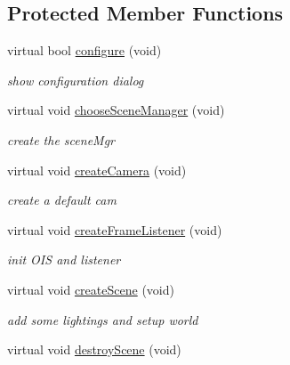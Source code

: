 \subsection*{Protected Member Functions}
\begin{DoxyCompactItemize}
\item 
virtual bool \hyperlink{class_whitedrop_1_1_whitedrop_engine_a9aaaf4639715462ebdd5bd8165da0f6a}{configure} (void)
\begin{DoxyCompactList}\small\item\em show configuration dialog \end{DoxyCompactList}\item 
\hypertarget{class_whitedrop_1_1_whitedrop_engine_adfdbe918f7e7614c539cd8954762a333}{virtual void \hyperlink{class_whitedrop_1_1_whitedrop_engine_adfdbe918f7e7614c539cd8954762a333}{choose\+Scene\+Manager} (void)}\label{class_whitedrop_1_1_whitedrop_engine_adfdbe918f7e7614c539cd8954762a333}

\begin{DoxyCompactList}\small\item\em create the scene\+Mgr \end{DoxyCompactList}\item 
virtual void \hyperlink{class_whitedrop_1_1_whitedrop_engine_a7e0779f436c679f507672b55d22b86f2}{create\+Camera} (void)
\begin{DoxyCompactList}\small\item\em create a default cam \end{DoxyCompactList}\item 
\hypertarget{class_whitedrop_1_1_whitedrop_engine_ada66ab6f532bb1c5cbde45d2566b8fe9}{virtual void \hyperlink{class_whitedrop_1_1_whitedrop_engine_ada66ab6f532bb1c5cbde45d2566b8fe9}{create\+Frame\+Listener} (void)}\label{class_whitedrop_1_1_whitedrop_engine_ada66ab6f532bb1c5cbde45d2566b8fe9}

\begin{DoxyCompactList}\small\item\em init O\+I\+S and listener \end{DoxyCompactList}\item 
\hypertarget{class_whitedrop_1_1_whitedrop_engine_a79d593cbe6b459294c6b045eda2261dc}{virtual void \hyperlink{class_whitedrop_1_1_whitedrop_engine_a79d593cbe6b459294c6b045eda2261dc}{create\+Scene} (void)}\label{class_whitedrop_1_1_whitedrop_engine_a79d593cbe6b459294c6b045eda2261dc}

\begin{DoxyCompactList}\small\item\em add some lightings and setup world \end{DoxyCompactList}\item 
\hypertarget{class_whitedrop_1_1_whitedrop_engine_a0022bf356fac3015e98fa535b0820af4}{virtual void \hyperlink{class_whitedrop_1_1_whitedrop_engine_a0022bf356fac3015e98fa535b0820af4}{destroy\+Scene} (void)}\label{class_whitedrop_1_1_whitedrop_engine_a0022bf356fac3015e98fa535b0820af4}


\end{DoxyCompactItemize}
